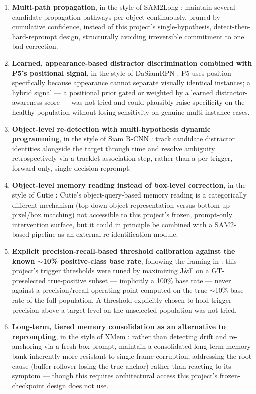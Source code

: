\documentclass[11pt]{article}
\begin{document}
\begin{enumerate}
\item \textbf{Multi-path propagation}, in the style of SAM2Long \citep{ding2024}: maintain several candidate propagation pathways per object continuously, pruned by cumulative confidence, instead of this project's single-hypothesis, detect-then-hard-reprompt design, structurally avoiding irreversible commitment to one bad correction.
\item \textbf{Learned, appearance-based distractor discrimination combined with P5's positional signal}, in the style of DaSiamRPN \citep{zhu2018}: P5 uses position specifically because appearance cannot separate visually identical instances; a hybrid signal — a positional prior gated or weighted by a learned distractor-awareness score — was not tried and could plausibly raise specificity on the healthy population without losing sensitivity on genuine multi-instance cases.
\item \textbf{Object-level re-detection with multi-hypothesis dynamic programming}, in the style of Siam R-CNN \citep{voigtlaender2020}: track candidate distractor identities alongside the target through time and resolve ambiguity retrospectively via a tracklet-association step, rather than a per-trigger, forward-only, single-decision reprompt.
\item \textbf{Object-level memory reading instead of box-level correction}, in the style of Cutie \citep{cheng2023cutie}: Cutie's object-query-based memory reading is a categorically different mechanism (top-down object representation versus bottom-up pixel/box matching) not accessible to this project's frozen, prompt-only intervention surface, but it could in principle be combined with a SAM2-based pipeline as an external re-identification module.
\item \textbf{Explicit precision-recall-based threshold calibration against the known $\sim$10\% positive-class base rate}, following the framing in \citet{saito2015}: this project's trigger thresholds were tuned by maximizing J\&F on a GT-preselected true-positive subset — implicitly a 100\% base rate — never against a precision/recall operating point computed on the true $\sim$10\% base rate of the full population. A threshold explicitly chosen to hold trigger precision above a target level on the unselected population was not tried.
\item \textbf{Long-term, tiered memory consolidation as an alternative to reprompting}, in the style of XMem \citep{cheng2022xmem}: rather than detecting drift and re-anchoring via a fresh box prompt, maintain a consolidated long-term memory bank inherently more resistant to single-frame corruption, addressing the root cause (buffer rollover losing the true anchor) rather than reacting to its symptom — though this requires architectural access this project's frozen-checkpoint design does not use.
\end{enumerate}
\end{document}
